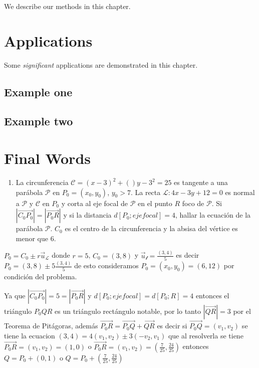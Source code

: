 \documentclass[12pt,]{report}
\providecommand{\tightlist}{%
  \setlength{\itemsep}{0pt}\setlength{\parskip}{0pt}}
\begin{document}
We describe our methods in this chapter.

\hypertarget{applications}{%
\chapter{Applications}\label{applications}}

Some \emph{significant} applications are demonstrated in this chapter.

\hypertarget{example-one}{%
\section{Example one}\label{example-one}}

\hypertarget{example-two}{%
\section{Example two}\label{example-two}}

\hypertarget{final-words}{%
\chapter{Final Words}\label{final-words}}

\begin{enumerate}
\def\labelenumi{\arabic{enumi}.}
\tightlist
\item
  La circunferencia \(\mathcal{C}=(x-3)^2+()y-3^2=25\) es tangente a una parábola \(\mathcal{P}\) en \(P_0=(x_0,y_0)\), \(y_0>7\). La recta \(\mathcal{L}:4x-3y+12=0\) es normal a \(\mathcal{P}\) y \(\mathcal{C}\) en \(P_0\) y corta al eje focal de \(\mathcal{P}\) en el punto \(R\) foco de \(\mathcal{P}\). Si \(\left|\vec{C_0P_0}\right|=\left|\vec{P_0R}\right|\) y si la distancia \(d[P_0;eje focal]=4\), hallar la ecuación de la parábola \(\mathcal{P}\). \(C_0\) es el centro de la circunferencia y la absisa del vértice es menor que 6.
\end{enumerate}

\(P_0=C_0\pm r\vec{u}_{\mathcal{L}}\) donde \(r=5\), \(C_0=(3,8)\) y \(\vec{u}_{\mathcal{l}}=\frac{(3,4)}{5}\) es decir \(P_0=(3,8)\pm 5\frac{(3,4)}{5}\) de esto consideramos \(P_0=(x_0,y_0)=(6,12)\) por condición del problema.

Ya que \(\left|\vec{C_0P_0}\right|=5=\left|\vec{P_0R}\right|\) y \(d[P_0;eje focal]=d[P_0; R]=4\) entonces el triángulo \(P_0QR\) es un triángulo rectángulo notable, por lo tanto \(\left|\vec{QR}\right|=3\) por el Teorema de Pitágoras, además \(\vec{P_0R}=\vec{P_0Q}+\vec{QR}\) es decir si \(\vec{P_0Q}=(v_1,v_2)\) se tiene la ecuacion \((3,4)=4(v_1,v_2)\pm 3(-v_2,v_1)\) que al resolverla se tiene \(\vec{P_0R}=(v_1,v_2)=(1,0)\) o \(\vec{P_0R}=(v_1,v_2)=\left(\frac{7}{25},\frac{24}{25}\right)\) entonces \(Q=P_0+(0,1)\) o \(Q=P_0+\left(\frac{7}{25},\frac{24}{25}\right)\)
\end{document}
